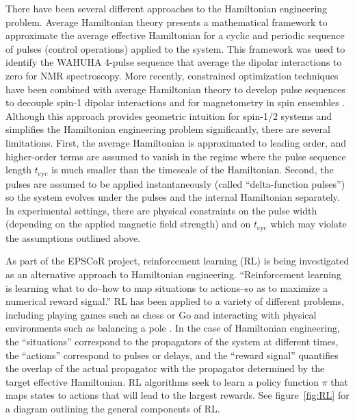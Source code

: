 \documentclass{article}
\begin{document}
There have been several different approaches to the Hamiltonian engineering problem.
Average Hamiltonian theory \cite{PhysRev.175.453} presents a mathematical framework to approximate the average effective Hamiltonian for a cyclic and periodic sequence of pulses (control operations) applied to the system.
This framework was used to identify the WAHUHA 4-pulse sequence \cite{PhysRevLett.20.180} that average the dipolar interactions to zero for NMR spectroscopy. More recently, constrained optimization techniques have been combined with average Hamiltonian theory to develop pulse sequences to decouple spin-1 dipolar interactions \cite{PhysRevLett.119.183603} and for magnetometry in spin ensembles \cite{O_Keeffe_2019}.
Although this approach provides geometric intuition for spin-1/2 systems and simplifies the Hamiltonian engineering problem significantly, there are several limitations. First, the average Hamiltonian is approximated to leading order, and higher-order terms are assumed to vanish in the regime where the pulse sequence length $t_\text{cyc}$ is much smaller than the timescale of the Hamiltonian. Second, the pulses are assumed to be applied instantaneously (called ``delta-function pulses'') so the system evolves under the pulses and the internal Hamiltonian separately.
In experimental settings, there are physical constraints on the pulse width (depending on the applied magnetic field strength) and on $t_\text{cyc}$ which may violate the assumptions outlined above.

As part of the EPSCoR project, reinforcement learning (RL) is being investigated as an alternative approach to Hamiltonian engineering.
``Reinforcement learning is learning what to do--how to map situations to actions--so as to maximize a numerical reward signal.'' \cite{sutton2018reinforcement} RL has been applied to a variety of different problems, including playing games such as chess or Go \cite{Silver1140} and interacting with physical environments such as balancing a pole \cite{lillicrap2015continuous}. In the case of Hamiltonian engineering, the ``situations'' correspond to the propagators of the system at different times, the ``actions'' correspond to pulses or delays, and the ``reward signal'' quantifies the overlap of the actual propagator with the propagator determined by the target effective Hamiltonian.
RL algorithms seek to learn a policy function $\pi$ that maps states to actions that will lead to the largest rewards. See figure~\ref{fig:RL} for a diagram outlining the general components of RL.
\end{document}

